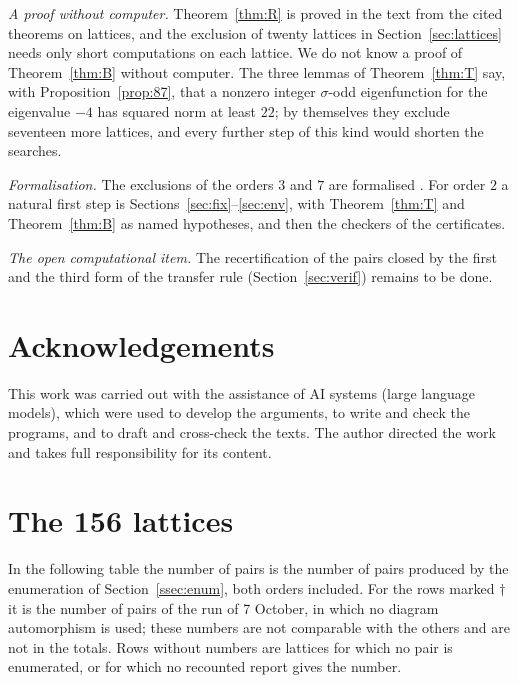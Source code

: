 \documentclass[11pt]{amsart}
\theoremstyle{definition}
\theoremstyle{remark}
\newcommand{\s}{\sigma}
\begin{document}
\emph{A proof without computer.} Theorem~\ref{thm:R} is proved in the text from the cited theorems on lattices, and the exclusion of twenty lattices
in Section~\ref{sec:lattices} needs only short computations on each lattice. We do not know a proof of Theorem~\ref{thm:B} without computer. The three lemmas of
Theorem~\ref{thm:T} say, with Proposition~\ref{prop:87}, that a nonzero integer $\s$-odd eigenfunction for the eigenvalue $-4$ has squared
norm at least $22$; by
themselves they exclude seventeen more lattices, and every further step of this kind would shorten the searches.

\emph{Formalisation.} The exclusions of the orders $3$ and $7$ are formalised \cite{D3,D7}. For order $2$ a natural first
step is Sections~\ref{sec:fix}--\ref{sec:env}, with Theorem~\ref{thm:T} and Theorem~\ref{thm:B} as named hypotheses, and
then the checkers of the certificates.

\emph{The open computational item.} The recertification of the pairs closed by the first and the third form of the
transfer rule (Section~\ref{sec:verif}) remains to be done.

\section*{Acknowledgements}
This work was carried out with the assistance of AI systems (large language models), which were used to develop the
arguments, to write and check the programs, and to draft and cross-check the texts. The author directed the work and takes
full responsibility for its content.

\appendix
\section{The 156 lattices}\label{app:table}

In the following table the number of pairs is the number of pairs produced by the enumeration of
Section~\ref{ssec:enum}, both orders included. For the rows marked $\dagger$ it is the number of pairs of the run of
7 October, in which no diagram automorphism is used; these numbers are not comparable with the others and are not in the
totals. Rows without numbers are lattices for which no pair is enumerated, or for which no recounted report gives the number.

{\small

}
\end{document}

